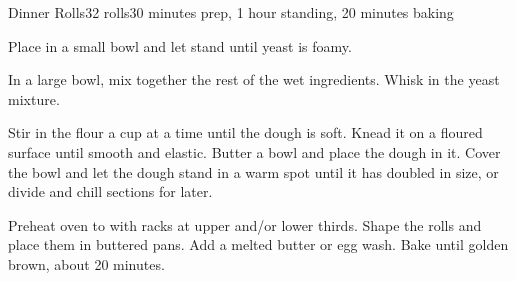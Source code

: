 \documentclass[../Cookbook.tex]{subfiles}
\begin{document}
\begin{recipe}[DinnerRolls]{Dinner Rolls}{32 rolls}{30 minutes prep, 1 hour standing, 20 minutes baking}

Place in a small bowl and let stand until yeast is foamy.

In a large bowl, mix together the rest of the wet ingredients. Whisk in the yeast mixture.

Stir in the flour a cup at a time until the dough is soft. Knead it on a floured surface until smooth and elastic. Butter a bowl and place the dough in it. Cover the bowl and let the dough stand in a warm spot until it has doubled in size, or divide and chill sections for later.

\newstep
Preheat oven to  with racks at upper and/or lower thirds. Shape the rolls and place them in buttered pans. Add a melted butter or egg wash. Bake until golden brown, about 20 minutes.

\end{recipe}
\end{document}
